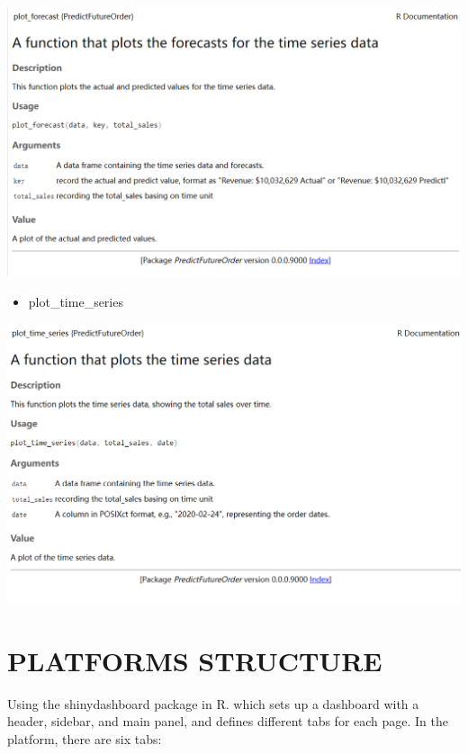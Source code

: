 \documentclass[
  11pt,
]{article}
\providecommand{\tightlist}{%
  \setlength{\itemsep}{0pt}\setlength{\parskip}{0pt}}\usepackage{longtable,booktabs,array}
\begin{document}
\includegraphics{img/plot_forecast.png}

\begin{itemize}
\tightlist
\item
  plot\_time\_series
\end{itemize}

\includegraphics{img/plot_time_series.png}

\hypertarget{platforms-structure}{%
\section{PLATFORMS STRUCTURE}\label{platforms-structure}}

Using the shinydashboard package in R. which sets up a dashboard with a
header, sidebar, and main panel, and defines different tabs for each
page. In the platform, there are six tabs:
\end{document}
